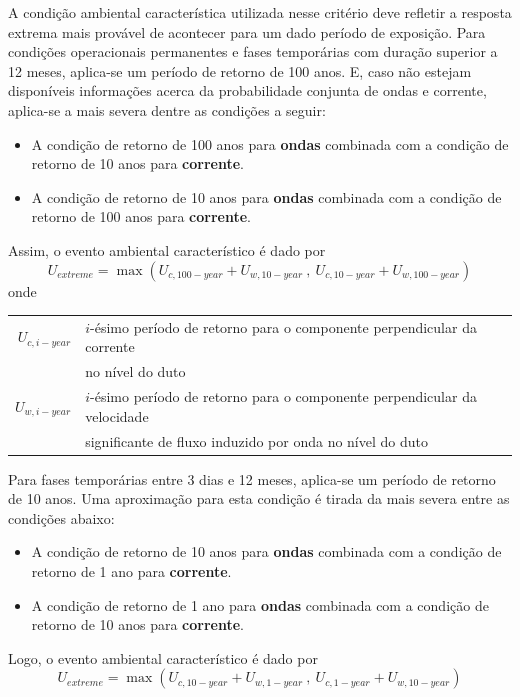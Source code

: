 A condição ambiental característica utilizada nesse critério deve refletir a resposta extrema mais provável de acontecer para um dado período de exposição.
Para condições operacionais permanentes e fases temporárias com duração superior a 12 meses, aplica-se um período de retorno de 100 anos.
E, caso não estejam disponíveis informações acerca da probabilidade conjunta de ondas e corrente, aplica-se a mais severa dentre as condições a seguir:
\begin{itemize}
\item A condição de retorno de 100 anos para \textbf{ondas} combinada com a condição de retorno de 10 anos para \textbf{corrente}.
\item A condição de retorno de 10 anos para \textbf{ondas} combinada com a condição de retorno de 100 anos para \textbf{corrente}.
\end{itemize}
Assim, o evento ambiental característico é dado por
\begin{equation}
U_\mathit{extreme} = \max\left( U_{c,100-\mathit{year}} + U_{w,10-\mathit{year}} ~,~ U_{c,10-\mathit{year}} + U_{w,100-\mathit{year}} \right)
\end{equation}
onde

\begin{tabular}{rl}
$U_{c,i-\mathit{year}}$ & $i$-ésimo período de retorno para o componente perpendicular da corrente \\
                        & no nível do duto\\
$U_{w,i-\mathit{year}}$ & $i$-ésimo período de retorno para o componente perpendicular da velocidade \\
                        & significante de fluxo induzido por onda no nível do duto
\end{tabular}


Para fases temporárias entre 3 dias e 12 meses, aplica-se um período de retorno de 10 anos.
Uma aproximação para esta condição é tirada da mais severa entre as condições abaixo:
\begin{itemize}
\item A condição de retorno de 10 anos para \textbf{ondas} combinada com a condição de retorno de 1 ano para \textbf{corrente}.
\item A condição de retorno de 1 ano para \textbf{ondas} combinada com a condição de retorno de 10 anos para \textbf{corrente}.
\end{itemize}

Logo, o evento ambiental característico é dado por
\begin{equation}
U_\mathit{extreme} =  \max\left( U_{c,10-\mathit{year}} + U_{w,1-\mathit{year}} ~,~ U_{c,1-\mathit{year}} + U_{w,10-{year}} \right)
\end{equation}

